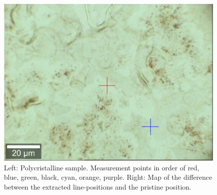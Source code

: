\documentclass[12pt,a4paper]{article}
\begin{document}
\begin{figure}
\centering
\includegraphics[scale=0.3]{Bilder/part7/Continuousoptical.png}
\caption{Left: Polycristalline sample. Measurement points in order of red, blue, green, black, cyan, orange, purple. Right: Map of the difference between the extracted line-positions and the pristine position.}
\label{fig:part7_sample}
\end{figure}
\end{document}
